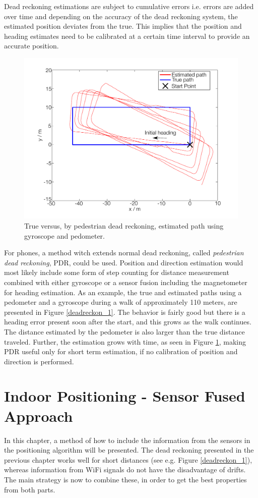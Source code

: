 \documentclass{LTHthesis}
\begin{document}
Dead reckoning estimations are subject to cumulative errors i.e. errors are added over time and depending on the accuracy of the dead reckoning system, the estimated position deviates from the true. This implies that the position and heading estimates need to be calibrated at a certain time interval to provide an accurate position.
%
\begin{figure}[!hbt]

\includegraphics[width=1\textwidth ]{images/kinematic/deadreckon_2}
\caption{True versus, by pedestrian dead reckoning, estimated path using gyroscope and pedometer.}\label{deadreckon_2}
\end{figure}
%
For phones, a method witch extends normal dead reckoning, called \emph{pedestrian dead reckoning}, PDR, could be used. Position and direction estimation would most likely include some form of step counting for distance measurement combined with either gyroscope or a sensor fusion including the magnetometer for heading estimation. As an example, the true and estimated paths using a pedometer and a gyroscope during a walk of approximately 110 meters, are presented in Figure \ref{deadreckon_1}. The behavior is fairly good but there is a heading error present soon after the start, and this grows as the walk continues. The distance estimated by the pedometer is also larger than the true distance traveled. Further, the estimation grows with time, as seen in Figure \ref{deadreckon_2}, making PDR useful only for short term estimation, if no calibration of position and direction is performed.  
%
\chapter{Indoor Positioning - Sensor Fused Approach} 
\label{chap:sensor_fused}
%
In this chapter, a method of how to include the information from the sensors in the positioning algorithm will be presented. The dead reckoning presented in the previous chapter works well for short distances (see e.g. Figure \ref{deadreckon_1}), whereas information from WiFi signals do not have the disadvantage of drifts. The main strategy is now to combine these, in order to get the best properties from both  parts.
\end{document}
